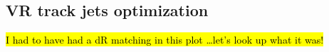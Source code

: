 \begin{figure}[htbp]
    \centering
    \caption{}
    \label{fig:\jetdef-fig1}
\end{figure}

\begin{figure}[htbp]
    \centering
    \caption{}
    \label{fig:\jetdef-fig2}
\end{figure}

\begin{figure}[htbp]
    \centering
    \caption{}
    \label{fig:\jetdef-fig3}
\end{figure}






\FloatBarrier
\clearpage
\subsection{VR track jets optimization}

\hl{I had to have had a dR matching in this plot \ldots let's look up what it was!}

